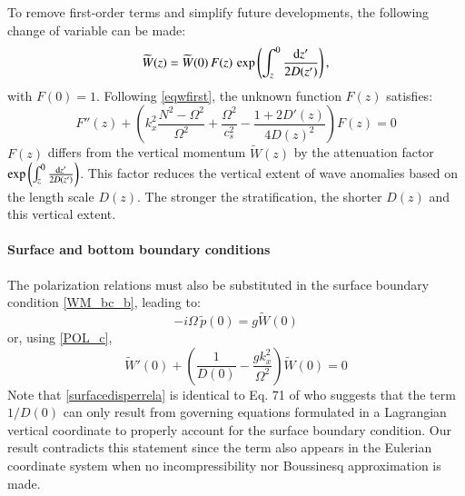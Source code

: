 \documentclass[a4paper,11pt]{article}
\begin{document}
To remove first-order terms and simplify future developments, the following change of variable can be made:
%
\begin{equation}
  \displaystyle
  \widetilde{W}(z)=\widetilde{W}(0)\, F(z)\, \exp\left(\int_{z}^0 \frac{{\rm d} z'}{2D(z')} \right) ,
  \label{CVF}
\end{equation}
with $F(0)=1$. Following \ref{eqwfirst}, the unknown function $F(z)$ satisfies:
%
\begin{equation}
  \displaystyle
  F''(z)
  +\left(
  k_x^2\frac{N^2-\Omega^2}{\Omega^2}
  +
  \frac{\Omega^2}{c_s^2}-\frac{1+2D'(z)}{4D(z)^2}
  \right)
  F(z)=0
  \label{eqF}
\end{equation}
%
$F(z)$ differs from the vertical momentum $\widetilde{W}(z)$ by the attenuation factor  $\exp\left(\int_{z}^0 \frac{{\rm d} z'}{2D(z')} \right)$. This factor reduces the vertical extent of wave anomalies based on the length scale $D(z)$. The stronger the stratification, the shorter $D(z)$ and this vertical extent.

\paragraph{Surface and bottom boundary conditions}
The polarization relations must also be substituted in the surface boundary condition \ref{WM_bc_b}, leading to:
%
\begin{equation}
  \displaystyle
  -i\Omega\, \widetilde{p}(0)=g \widetilde{W}(0)
\end{equation}
or, using \ref{POL_c},
\begin{equation}
  \displaystyle
  \widetilde{W}'(0)+\left(
  \frac{1}{D(0)}-\frac{gk_x^2}{\Omega^2}
  \right)\widetilde{W}(0)=0
  \label{surfacedisperrela}
\end{equation}
%
%
Note that \ref{surfacedisperrela} is identical to Eq. 71 of \cite{dukowicz_2013} who suggests that the term $1/D(0)$ can only result from governing equations formulated in a Lagrangian vertical coordinate to properly account for the surface boundary condition. Our result contradicts this statement since the term also appears in the Eulerian coordinate system when no incompressibility nor Boussinesq approximation is made.
\end{document}
